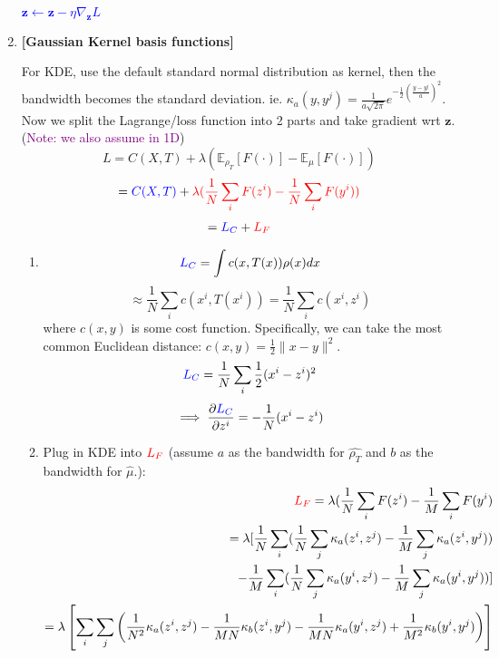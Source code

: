 \documentclass[11pt]{article}
\begin{document}
\begin{enumerate}
\begin{algorithm}[h]
\begin{algorithmic}
        \textcolor{blue}{\State $\mathbf{z} \gets \mathbf{z} - \eta \nabla_{\mathbf{z}} L$} 
        \EndWhile
            
        \end{algorithmic}
        \end{algorithm}
    
    \item {\bf [Gaussian Kernel basis functions]}
    
    For KDE, use the default standard normal distribution as kernel, then the bandwidth becomes the standard deviation.
    ie. $\kappa_a(y,y^j) = \frac{1}{a \sqrt{2\pi}} e^{-\frac{1}{2}(\frac{y-y^j}{a})^2}$. Now we split the Lagrange/loss function into 2 parts and take gradient wrt $\mathbf{z}$. (\textcolor{purple}{Note: we also assume in 1D})
    $$
    L = C(X,T) + \lambda (\mathbb{E}_{\rho_{T}} [F(\cdot)] - \mathbb{E}_{\mu} [F(\cdot)])
    $$
    $$
    = \textcolor{blue}{C(X,T)} + \textcolor{red}{\lambda (\frac{1}{N} \sum_i F(z^i) - \frac{1}{N} \sum_i F(y^i))}
    $$
    \begin{align}
        = \textcolor{blue}{L_C} + \textcolor{red}{L_F}
    \end{align}
    
    \begin{enumerate}
        \item 
        $$
        \textcolor{blue}{L_C} = \int c(x,T(x)) \rho(x) dx
        $$
        $$
        \approx \frac{1}{N} \sum_i c(x^i,T(x^i))
        = \frac{1}{N} \sum_i c(x^i,z^i)
        $$
        where $c(x,y)$ is some cost function. Specifically, we can take the most common Euclidean distance: $c(x,y) = \frac{1}{2} \|x-y\|^2$.
        $$
        \textcolor{blue}{L_C} = \frac{1}{N} \sum_i \frac{1}{2}(x^i-z^i)^2
        $$
        \begin{align*}
            \implies \frac{\partial \textcolor{blue}{L_C}}{\partial z^i}
            = - \frac{1}{N}(x^i-z^i)
        \end{align*}
        
        \item Plug in KDE into $\textcolor{red}{L_F}$ (assume $a$ as the bandwidth for $\hat{\rho_T}$ and $b$ as the bandwidth for $\hat{\mu}$.):
        \begin{align*}
            \textcolor{red}{L_F} = \lambda (\frac{1}{N} \sum_i F(z^i) - \frac{1}{M} \sum_i F(y^i)\\
            =  \lambda [\frac{1}{N} \sum_i (\frac{1}{N} \sum_j \kappa_a(z^i,z^j) - \frac{1}{M} \sum_j \kappa_a(z^i,y^j))\\
            - \frac{1}{M} \sum_i (\frac{1}{N} \sum_j \kappa_a(y^i,z^j) - \frac{1}{M} \sum_j \kappa_a(y^i,y^j))]\\
            = \lambda \left[\sum_i \sum_j \left( 
            \frac{1}{N^2}\kappa_a(z^i,z^j) -  \frac{1}{MN}\kappa_b(z^i,y^j) -   \frac{1}{MN}\kappa_a(y^i,z^j) +  \frac{1}{M^2}\kappa_b(y^i,y^j)
            \right) \right]
        \end{align*}
        

\end{enumerate}
\end{enumerate}
\end{document}
